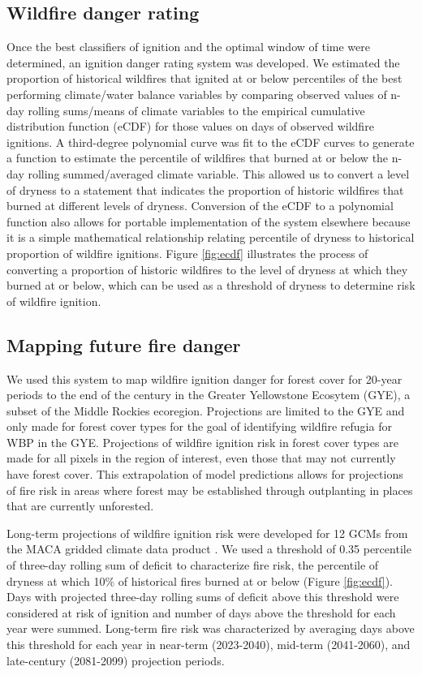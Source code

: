 \documentclass[11p]{article}
\begin{document}
\subsection{Wildfire danger rating}

Once the best classifiers of ignition and the optimal window of time were determined, an ignition danger rating system was developed. We estimated the proportion of historical wildfires that ignited at or below percentiles of the best performing climate/water balance variables by comparing observed values of n-day rolling sums/means of climate variables to the empirical cumulative distribution function (eCDF) for those values on days of observed wildfire ignitions. A third-degree polynomial curve was fit to the eCDF curves to generate a function to estimate the percentile of wildfires that burned at or below the n-day rolling summed/averaged climate variable. This allowed us to convert a level of dryness to a statement that indicates the proportion of historic wildfires that burned at different levels of dryness. Conversion of the eCDF to a polynomial function also allows for portable implementation of the system elsewhere because it is a simple mathematical relationship relating percentile of dryness to historical proportion of wildfire ignitions. Figure \ref{fig:ecdf} illustrates the process of converting a proportion of historic wildfires to the level of dryness at which they burned at or below, which can be used as a threshold of dryness to determine risk of wildfire ignition.

\subsection{Mapping future fire danger}

We used this system to map wildfire ignition danger for forest cover for 20-year periods to the end of the century in the Greater Yellowstone Ecosytem (GYE), a subset of the Middle Rockies ecoregion. Projections are limited to the GYE and only made for forest cover types for the goal of identifying wildfire refugia for WBP in the GYE. Projections of wildfire ignition risk in forest cover types are made for all pixels in the region of interest, even those that may not currently have forest cover. This extrapolation of model predictions allows for projections of fire risk in areas where forest may be established through outplanting in places that are currently unforested.

Long-term projections of wildfire ignition risk were developed for 12 GCMs from the MACA gridded climate data product \citep{abatzoglouComparisonStatisticalDownscaling2012}. We used a threshold of 0.35 percentile of three-day rolling sum of deficit to characterize fire risk, the percentile of dryness at which 10\% of historical fires burned at or below (Figure \ref{fig:ecdf}). Days with projected three-day rolling sums of deficit above this threshold were considered at risk of ignition and number of days above the threshold for each year were summed. Long-term fire risk was characterized by averaging days above this threshold for each year in near-term (2023-2040), mid-term (2041-2060), and late-century (2081-2099) projection periods. 
\end{document}
